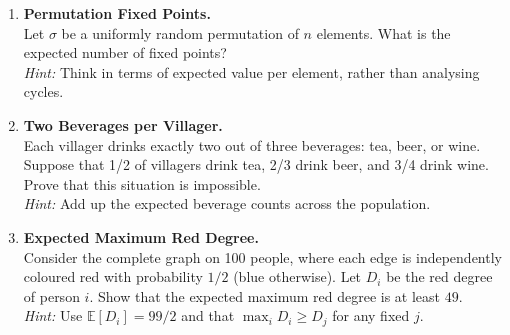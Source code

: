 {\begin{enumerate}
    \item \textbf{Permutation Fixed Points.}\\
    Let \( \sigma \) be a uniformly random permutation of \( n \) elements. What is the expected number of fixed points?\\[0.5em]
    \textit{Hint:} Think in terms of expected value per element, rather than analysing cycles.

    \item \textbf{Two Beverages per Villager.}\\
    Each villager drinks exactly two out of three beverages: tea, beer, or wine. Suppose that 1/2 of villagers drink tea, 2/3 drink beer, and 3/4 drink wine. Prove that this situation is impossible.\\[0.5em]
    \textit{Hint:} Add up the expected beverage counts across the population.

    \item \textbf{Expected Maximum Red Degree.}\\
    Consider the complete graph on 100 people, where each edge is independently coloured red with probability $1/2$ (blue otherwise). Let $D_i$ be the red degree of person $i$. Show that the expected maximum red degree is at least $49$.\\[0.5em]
    \textit{Hint:} Use $\mathbb{E}[D_i]=99/2$ and that $\max_i D_i \ge D_j$ for any fixed $j$.

\end{enumerate}

\noindent\hrulefill

\begin{center}
\end{center}
}
